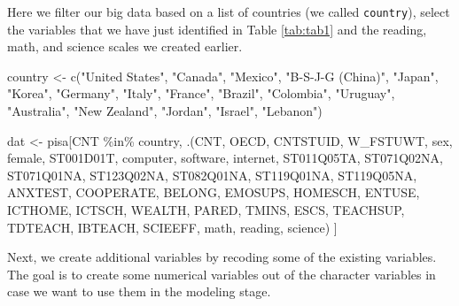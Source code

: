 \documentclass[
]{book}
\newenvironment{Shaded}{\begin{snugshade}}{\end{snugshade}}
\newcommand{\FunctionTok}[1]{\textcolor[rgb]{0.00,0.00,0.00}{#1}}
\newcommand{\NormalTok}[1]{#1}
\newcommand{\OtherTok}[1]{\textcolor[rgb]{0.56,0.35,0.01}{#1}}
\newcommand{\SpecialCharTok}[1]{\textcolor[rgb]{0.00,0.00,0.00}{#1}}
\newcommand{\StringTok}[1]{\textcolor[rgb]{0.31,0.60,0.02}{#1}}
\begin{document}
Here we filter our big data based on a list of countries (we called \texttt{country}), select the variables that we have just identified in Table \ref{tab:tab1} and the reading, math, and science scales we created earlier.

\begin{Shaded}
\begin{Highlighting}[]
\NormalTok{country }\OtherTok{\textless{}{-}} \FunctionTok{c}\NormalTok{(}\StringTok{"United States"}\NormalTok{, }\StringTok{"Canada"}\NormalTok{, }\StringTok{"Mexico"}\NormalTok{, }\StringTok{"B{-}S{-}J{-}G (China)"}\NormalTok{, }\StringTok{"Japan"}\NormalTok{,}
             \StringTok{"Korea"}\NormalTok{, }\StringTok{"Germany"}\NormalTok{, }\StringTok{"Italy"}\NormalTok{, }\StringTok{"France"}\NormalTok{, }\StringTok{"Brazil"}\NormalTok{, }\StringTok{"Colombia"}\NormalTok{, }\StringTok{"Uruguay"}\NormalTok{,}
             \StringTok{"Australia"}\NormalTok{, }\StringTok{"New Zealand"}\NormalTok{, }\StringTok{"Jordan"}\NormalTok{, }\StringTok{"Israel"}\NormalTok{, }\StringTok{"Lebanon"}\NormalTok{)}

\NormalTok{dat }\OtherTok{\textless{}{-}}\NormalTok{ pisa[CNT }\SpecialCharTok{\%in\%}\NormalTok{ country,}
\NormalTok{            .(CNT, OECD, CNTSTUID, W\_FSTUWT, sex, female,}
\NormalTok{              ST001D01T, computer, software, internet,}
\NormalTok{              ST011Q05TA, ST071Q02NA, ST071Q01NA, ST123Q02NA,}
\NormalTok{              ST082Q01NA, ST119Q01NA, ST119Q05NA, ANXTEST,}
\NormalTok{              COOPERATE, BELONG,  EMOSUPS, HOMESCH, ENTUSE,}
\NormalTok{              ICTHOME, ICTSCH, WEALTH, PARED, TMINS, ESCS,}
\NormalTok{              TEACHSUP, TDTEACH, IBTEACH, SCIEEFF,}
\NormalTok{              math, reading, science)}
\NormalTok{            ]}
\end{Highlighting}
\end{Shaded}

Next, we create additional variables by recoding some of the existing variables. The goal is to create some numerical variables out of the character variables in case we want to use them in the modeling stage.
\end{document}

